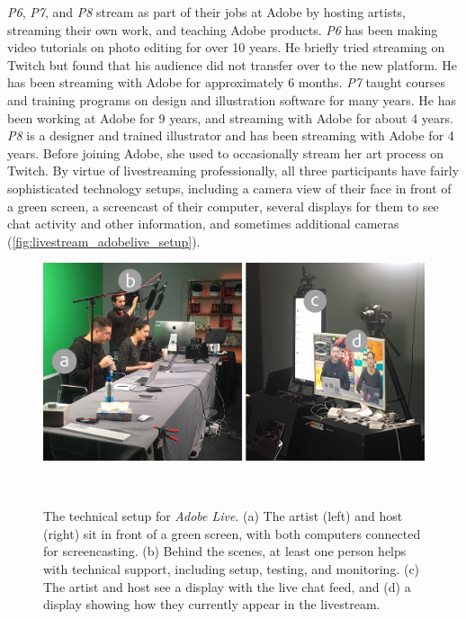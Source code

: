 \textit{P6}, \textit{P7}, and \textit{P8} stream as part of their jobs at Adobe by hosting artists, streaming their own work, and teaching Adobe products.
\textit{P6} has been making video tutorials on photo editing for over 10 years. He briefly tried streaming on Twitch but found that his audience did not transfer over to the new platform. He has been streaming with Adobe for approximately 6 months. \textit{P7} taught courses and training programs on design and illustration software for many years. He has been working at Adobe for 9 years, and streaming with Adobe for about 4 years. 
\textit{P8} is a designer and trained illustrator and has been streaming with Adobe for 4 years. Before joining Adobe, she used to occasionally stream her art process on Twitch. By virtue of livestreaming professionally, all three participants have fairly sophisticated technology setups, including a camera view of their face in front of a green screen, a screencast of their computer, several displays for them to see chat activity and other information, and sometimes additional cameras (\autoref{fig:livestream_adobelive_setup}). 

\begin{figure}[t]
\centering
  \includegraphics[width=1\columnwidth]{livestreams/figures/adobelive_setup.png}
  \caption{The technical setup for \textit{Adobe Live}. (a) The artist (left) and host (right) sit in front of a green screen, with both computers connected for screencasting. (b) Behind the scenes, at least one person helps with technical support, including setup, testing, and monitoring. (c) The artist and host see a display with the live chat feed, and (d) a display showing how they currently appear in the livestream. }~\label{fig:livestream_adobelive_setup}
  \vspace{-0.2in}
\end{figure}

